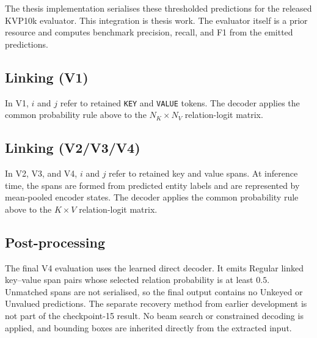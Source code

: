 The thesis implementation serialises these thresholded predictions for the
released KVP10k evaluator. This integration is thesis work. The evaluator
itself is a prior resource and computes benchmark precision, recall, and F1
from the emitted predictions.

\subsection{Linking (V1)}
\label{sec:v1-linking-inference}

In V1, $i$ and $j$ refer to retained \texttt{KEY} and \texttt{VALUE} tokens.
The decoder applies the common probability rule above to the
$N_K\times N_V$ relation-logit matrix.

\subsection{Linking (V2/V3/V4)}
\label{sec:v2-linking-inference}

In V2, V3, and V4, $i$ and $j$ refer to retained key and value spans. At
inference time, the spans are formed from predicted entity labels and are
represented by mean-pooled encoder states. The decoder applies the common
probability rule above to the $K\times V$ relation-logit matrix.

\subsection{Post-processing}
\label{sec:post-processing}

The final V4 evaluation uses the learned direct decoder. It emits Regular
linked key--value span pairs whose selected relation probability is at least
$0.5$. Unmatched spans are not serialised, so the final output contains no
Unkeyed or Unvalued predictions. The separate recovery method from earlier
development is not part of the checkpoint-15 result.
No beam search or constrained decoding is applied, and bounding boxes are
inherited directly from the extracted input.
